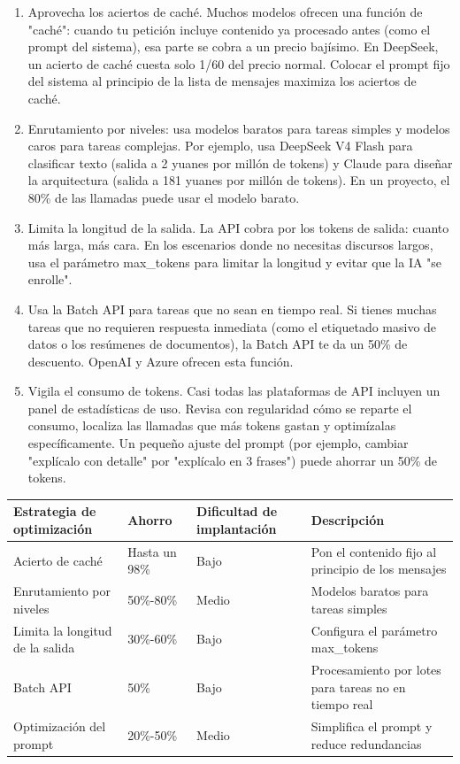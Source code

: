 \begin{enumerate}
  \item Aprovecha los aciertos de caché. Muchos modelos ofrecen una función de "caché": cuando tu petición incluye contenido ya procesado antes (como el prompt del sistema), esa parte se cobra a un precio bajísimo. En DeepSeek, un acierto de caché cuesta solo 1/60 del precio normal. Colocar el prompt fijo del sistema al principio de la lista de mensajes maximiza los aciertos de caché.
  \item Enrutamiento por niveles: usa modelos baratos para tareas simples y modelos caros para tareas complejas. Por ejemplo, usa DeepSeek V4 Flash para clasificar texto (salida a 2 yuanes por millón de tokens) y Claude para diseñar la arquitectura (salida a 181 yuanes por millón de tokens). En un proyecto, el 80\% de las llamadas puede usar el modelo barato.
  \item Limita la longitud de la salida. La API cobra por los tokens de salida: cuanto más larga, más cara. En los escenarios donde no necesitas discursos largos, usa el parámetro max\_tokens para limitar la longitud y evitar que la IA "se enrolle".
  \item Usa la Batch API para tareas que no sean en tiempo real. Si tienes muchas tareas que no requieren respuesta inmediata (como el etiquetado masivo de datos o los resúmenes de documentos), la Batch API te da un 50\% de descuento. OpenAI y Azure ofrecen esta función.
  \item Vigila el consumo de tokens. Casi todas las plataformas de API incluyen un panel de estadísticas de uso. Revisa con regularidad cómo se reparte el consumo, localiza las llamadas que más tokens gastan y optimízalas específicamente. Un pequeño ajuste del prompt (por ejemplo, cambiar "explícalo con detalle" por "explícalo en 3 frases") puede ahorrar un 50\% de tokens.
\end{enumerate}

\begin{center}
\begin{tabularx}{\linewidth}{|X|X|X|X|}
\hline
\textbf{Estrategia de optimización} & \textbf{Ahorro} & \textbf{Dificultad de implantación} & \textbf{Descripción} \tabularnewline
\hline
Acierto de caché & Hasta un 98\% & Bajo & Pon el contenido fijo al principio de los mensajes \tabularnewline
Enrutamiento por niveles & 50\%-80\% & Medio & Modelos baratos para tareas simples \tabularnewline
Limita la longitud de la salida & 30\%-60\% & Bajo & Configura el parámetro max\_tokens \tabularnewline
Batch API & 50\% & Bajo & Procesamiento por lotes para tareas no en tiempo real \tabularnewline
Optimización del prompt & 20\%-50\% & Medio & Simplifica el prompt y reduce redundancias \tabularnewline
\hline
\end{tabularx}
\end{center}

